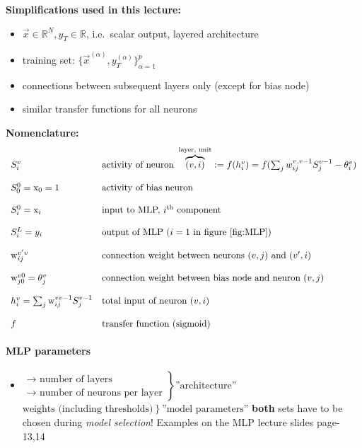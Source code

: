 \textbf{Simplifications used in this lecture:}
\begin{itemize}
	\item $\vec{x} \in \mathbb{R}^N, y_T \in \mathbb{R}$, i.e.\ scalar output, layered architecture
	\item training set: 
					$\big\{\vec x^{(\alpha)}, y_T^{(\alpha)} \big\}_{\alpha=1}^p$
	\item connections between subsequent layers only (except for bias node)
	\item similar transfer functions for all neurons
\end{itemize}
{\bf Nomenclature:}
\begin{equation*}
\begin{array}{ll}
	S_i^v & \text{activity of neuron } 
			\overbrace{(v, i)}^{\text{layer, unit}} := f(h_i^v) = f(\sum_j w_{ij}^{v,v-1} S_j^{v-1}-\theta_i^{v})\\\\
	S_0^0 = \mathrm{x}_0 = 1 & \text{activity of bias neuron} \\\\
	S_i^0 = \mathrm{x}_i & \text{input to MLP, } i^{\text{th}} 
			\text{ component} \\\\
	S_i^L = y_i & \text{output of MLP } (i=1 \text{ in figure } \ref{fig:MLP})\\\\
	\mathrm{w}_{ij}^{v'v} & \text{connection weight between neurons } 
			(v, j) \text{ and } (v', i) \\\\
	\mathrm{w}_{j0}^{v0} = \theta_j^v & \text{connection weight between 
			bias node and neuron } (v, j) \\\\
	h_i^v = \sum_j \mathrm{w}_{ij}^{vv-1} S_j^{v-1} & \text{total input
			of neuron } (v, i) \\\\
	f & \text{transfer function (sigmoid)}
\end{array}
\end{equation*}

\paragraph{MLP parameters}
\begin{itemize}
	\item[]
	$ \left.
	\begin{array}{l}
		\rightarrow \text{ number of layers} \\
		\rightarrow \text{ number of neurons per layer} 
	\end{array} 
	\right \} \text{''architecture''}$ 
	\itr $\left. \text{weights (including thresholds)} \right\} 
		\text{''model parameters''}$
	\itR \textbf{both} sets have to be chosen during \emph{model selection}! Examples on the MLP lecture slides page-13,14
\end{itemize} 
